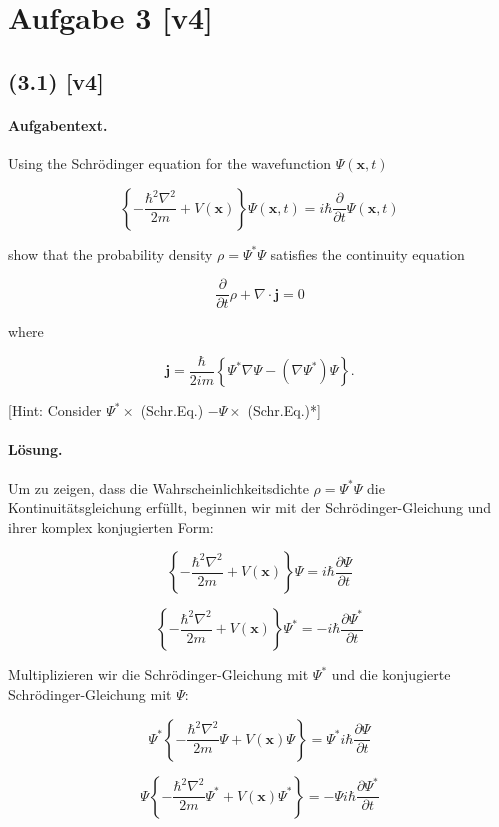 \documentclass[11pt,a4paper]{article}
\begin{document}
\section*{Aufgabe 3 [v4]}
\subsection*{(3.1) [v4]}
\paragraph{Aufgabentext.}
Using the Schrödinger equation for the wavefunction $\Psi(\mathbf{x}, t)$

$$
\left\{-\frac{\hbar^2 \nabla^2}{2 m}+V(\mathbf{x})\right\} \Psi(\mathbf{x}, t)=i \hbar \frac{\partial}{\partial t} \Psi(\mathbf{x}, t)
$$

show that the probability density $\rho=\Psi^* \Psi$ satisfies the continuity equation

$$
\frac{\partial}{\partial t} \rho+\nabla \cdot \mathbf{j}=0
$$

where

$$
\mathbf{j}=\frac{\hbar}{2 i m}\left\{\Psi^* \nabla \Psi-\left(\nabla \Psi^*\right) \Psi\right\} .
$$

[Hint: Consider $\Psi^* \times$ (Schr.Eq.) $-\Psi \times$ (Schr.Eq.)*]

\paragraph{Lösung.}
Um zu zeigen, dass die Wahrscheinlichkeitsdichte \(\rho = \Psi^* \Psi\) die Kontinuitätsgleichung erfüllt, beginnen wir mit der Schrödinger-Gleichung und ihrer komplex konjugierten Form:

\[
\left\{-\frac{\hbar^2 \nabla^2}{2 m} + V(\mathbf{x})\right\} \Psi = i \hbar \frac{\partial \Psi}{\partial t}
\]

\[
\left\{-\frac{\hbar^2 \nabla^2}{2 m} + V(\mathbf{x})\right\} \Psi^* = -i \hbar \frac{\partial \Psi^*}{\partial t}
\]

Multiplizieren wir die Schrödinger-Gleichung mit \(\Psi^*\) und die konjugierte Schrödinger-Gleichung mit \(\Psi\):

\[
\Psi^* \left\{-\frac{\hbar^2 \nabla^2}{2 m} \Psi + V(\mathbf{x}) \Psi\right\} = \Psi^* i \hbar \frac{\partial \Psi}{\partial t}
\]

\[
\Psi \left\{-\frac{\hbar^2 \nabla^2}{2 m} \Psi^* + V(\mathbf{x}) \Psi^*\right\} = -\Psi i \hbar \frac{\partial \Psi^*}{\partial t}
\]
\end{document}
